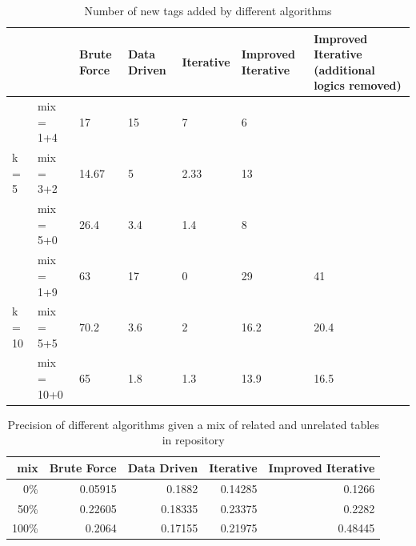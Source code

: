 \begin{table}[h!]
    \centering
    \scriptsize
    \begin{center}
      \caption{Number of new tags added by different algorithms}
      \label{tab:Number-of-new-tags-added-by-different-algorithms}
      \begin{tabular}{|p{}|p{}|p{}|p{}|p{}|p{}|p{}|}  
        \hline
         & & \textbf{Brute Force} & \textbf{Data Driven} & \textbf{Iterative} & \textbf{Improved Iterative} & \textbf{Improved Iterative (additional logics removed)}\\
        \hline
        \multirow{3}{*}{k = 5} & mix = 1+4 & 17 & 15 & 7 & 6 & \\
        \cline{2-7}
        & mix = 3+2 & 14.67 & 5 & 2.33 & 13 & \\
        \cline{2-7}
        & mix = 5+0 & 26.4 & 3.4 & 1.4 & 8 & \\
        \hline        
        \multirow{3}{*}{k = 10} & mix = 1+9 & 63 & 17 & 0 & 29 & 41 \\
        \cline{2-7}
        & mix = 5+5 & 70.2 & 3.6 & 2 & 16.2 & 20.4 \\
        \cline{2-7}
        & mix = 10+0 & 65 & 1.8 & 1.3 & 13.9 & 16.5 \\
        \hline
      \end{tabular}
    \end{center}
\end{table}



\begin{table}[h!]
    \centering
    \scriptsize
    \begin{center}
      \caption{Precision of different algorithms given a mix of related and unrelated tables in repository}
      \label{tab:Precision-of-different-algorithms-given-a-mix-of-related-and-unrelated-tables-in-repository}
      \begin{tabular}{|r|r|r|r|r|}
        \hline
        \textbf{mix} & \textbf{Brute Force} & \textbf{Data Driven} & \textbf{Iterative} & \textbf{Improved Iterative} \\
        \hline
        0\% & 0.05915 & 0.1882 & 0.14285 & 0.1266 \\
        \hline
        50\% & 0.22605 & 0.18335 & 0.23375 & 0.2282 \\
        \hline
        100\% & 0.2064 & 0.17155 & 0.21975 & 0.48445 \\
        \hline
      \end{tabular}
    \end{center}
\end{table}

